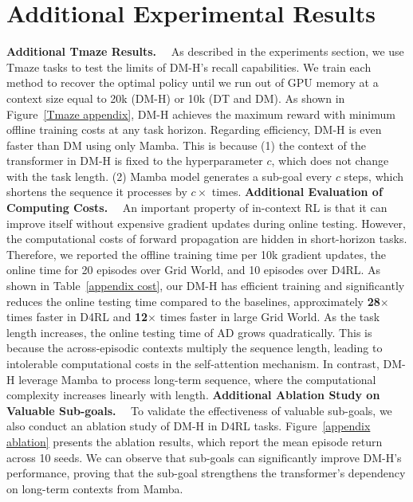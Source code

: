 \documentclass{article}
\begin{document}
\section{Additional Experimental Results}
\label{additional experiments}
\noindent\textbf{Additional Tmaze Results.}~~
As described in the experiments section, we use Tmaze tasks to test the limits of DM-H's recall capabilities. We train each method to recover the optimal policy until we run out of GPU memory at a context size equal to 20k (DM-H) or 10k (DT and DM). As shown in Figure~\ref{Tmaze appendix}, DM-H achieves the maximum reward with minimum offline training costs at any task horizon. Regarding efficiency, DM-H is even faster than DM using only Mamba. This is because (1) the context of the transformer in DM-H is fixed to the hyperparameter $c$, which does not change with the task length. (2) Mamba model generates a sub-goal every $c$ steps, which shortens the sequence it processes by $c\times$ times.
\noindent\textbf{Additional Evaluation of Computing Costs.}~~
An important property of in-context RL is that it can improve itself without expensive gradient updates during online testing. However, the computational costs of forward propagation are hidden in short-horizon tasks. Therefore, we reported the offline training time per 10k gradient updates, the online time for 20 episodes over Grid World, and 10 episodes over D4RL. As shown in Table~\ref{appendix cost}, our DM-H has efficient training and significantly reduces the online testing time compared to the baselines, approximately \textbf{28$\times$} times faster in D4RL and \textbf{12$\times$} times faster in large Grid World. As the task length increases, the online testing time of AD grows quadratically.
This is because the across-episodic contexts multiply the sequence length, leading to intolerable computational costs in the self-attention mechanism. In contrast, DM-H leverage Mamba to process long-term sequence, where the computational complexity increases linearly with length.
\noindent\textbf{Additional Ablation Study on Valuable Sub-goals.}~~
To validate the effectiveness of valuable sub-goals, we also conduct an ablation study of DM-H in D4RL tasks.
Figure~\ref{appendix ablation} presents the ablation results, which report the mean episode return across 10 seeds. We can observe that sub-goals can significantly improve DM-H's performance, proving that the sub-goal strengthens the transformer's dependency on long-term contexts from Mamba.
\end{document}
